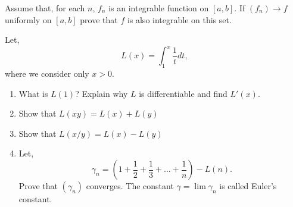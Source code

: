 \documentclass[12pt]{article}
\makeatletter
\theoremstyle{homework}
\newenvironment{exercise}[1]
{\def\@currentlabel{#1}\exercisecore}
{\endexercisecore}
\makeatother
\begin{document}
\begin{exercise}{11} Assume that, for each $n$, $f_n$ is an integrable function on $[a,b].$
  If $(f_n) \to f$ uniformly on $[a,b]$ prove that $f$ is also integrable on this set. 
  
\end{exercise}
\vspace{.5in}

\begin{exercise}{12} Let,
  \begin{equation*}
    L(x) = \int_1^x \dfrac{1}{t} dt,
  \end{equation*}
  where we consider only $x > 0$.
  \begin{enumerate}
    \item What is $L(1)$? Explain why $L$ is differentiable and find $L'(x).$
    \item Show that $L(xy) = L(x)+L(y)$
    \item Show that $L(x/y) = L(x) - L(y)$
    \item Let,
    \begin{equation*}
      \gamma_n = (1 + \frac{1}{2} + \frac{1}{3}+ \dots+ \frac{1}{n}) - L(n).
    \end{equation*}
    Prove that $(\gamma_n)$ converges. The constant $\gamma = \lim \gamma_n$ is called Euler's constant.
  \end{enumerate}
\end{exercise}
\end{document}
